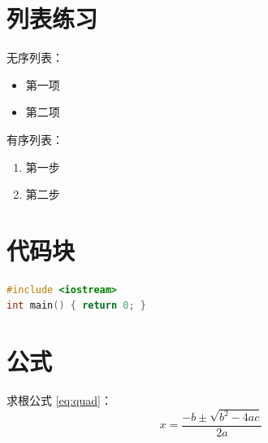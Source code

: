 \documentclass[UTF8]{ctexart}
\begin{document}
\section{列表练习}
无序列表：
\begin{itemize}
\item 第一项
\item 第二项
\end{itemize}
有序列表：
\begin{enumerate}
\item 第一步
\item 第二步
\end{enumerate}

\section{代码块}
\begin{lstlisting}[language=C++]
#include <iostream>
int main() { return 0; }
\end{lstlisting}

\section{公式}
求根公式 \eqref{eq:quad}：
\begin{equation}
x = \frac{-b \pm \sqrt{b^2-4ac}}{2a}
\label{eq:quad}
\end{equation}
\end{document}
